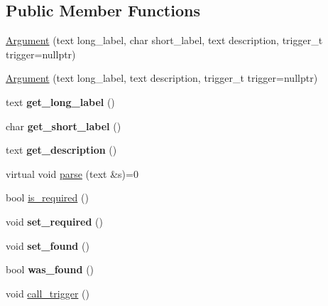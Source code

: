 \subsection*{Public Member Functions}
\begin{DoxyCompactItemize}
\item 
\hyperlink{classez_1_1arguments_1_1Argument_af4799a33a85a7c1d11190f9f285b1117}{Argument} (text long\+\_\+label, char short\+\_\+label, text description, trigger\+\_\+t trigger=nullptr)
\item 
\hyperlink{classez_1_1arguments_1_1Argument_a86a267b41b09aba45426c36e4e92b097}{Argument} (text long\+\_\+label, text description, trigger\+\_\+t trigger=nullptr)
\item 
\mbox{\label{classez_1_1arguments_1_1Argument_afc1595edacf1f3cd7f186fad18b8e518}} 
text {\bfseries get\+\_\+long\+\_\+label} ()
\item 
\mbox{\label{classez_1_1arguments_1_1Argument_a47ef11edb93c428268c19a7ab6c0aad4}} 
char {\bfseries get\+\_\+short\+\_\+label} ()
\item 
\mbox{\label{classez_1_1arguments_1_1Argument_a71d439c68e7d0c9bca9f61bce30cfaa9}} 
text {\bfseries get\+\_\+description} ()
\item 
virtual void \hyperlink{classez_1_1arguments_1_1Argument_a7a4eb6a4d030416307584d8e77c2305a}{parse} (text \&s)=0
\item 
bool \hyperlink{classez_1_1arguments_1_1Argument_a049c9d70c97e990176247b5f4125f944}{is\+\_\+required} ()
\item 
\mbox{\label{classez_1_1arguments_1_1Argument_a53a46cca0e608200f6b00df441c3e8b3}} 
void {\bfseries set\+\_\+required} ()
\item 
\mbox{\label{classez_1_1arguments_1_1Argument_ae358f87661528ecb27e838d7af17675a}} 
void {\bfseries set\+\_\+found} ()
\item 
\mbox{\label{classez_1_1arguments_1_1Argument_a6e2f301f66312f1d45e2ade7921e7c42}} 
bool {\bfseries was\+\_\+found} ()
\item 
void \hyperlink{classez_1_1arguments_1_1Argument_a740f929b9c34fbcdc20e4105034bd369}{call\+\_\+trigger} ()
\end{DoxyCompactItemize}

